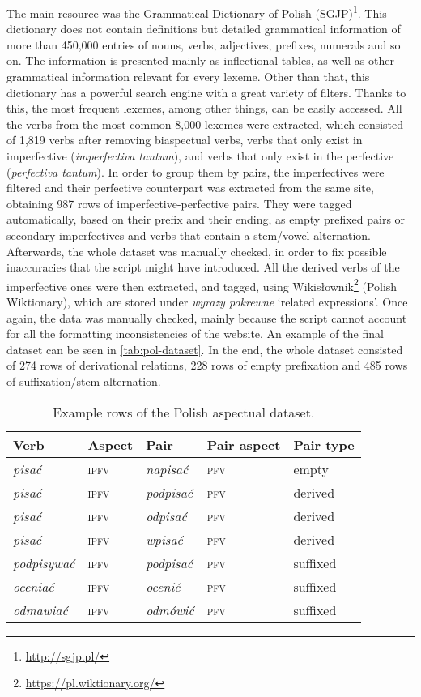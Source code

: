 \documentclass[12pt]{article}
\newcommand{\ita}[1]{\textit{#1}}
\begin{document}
The main resource was the Grammatical Dictionary of Polish (SGJP)\footnote{\url{http://sgjp.pl/}}. This dictionary does not contain definitions but detailed grammatical information of more than 450,000 entries of nouns, verbs, adjectives, prefixes, numerals and so on. The information is presented mainly as inflectional tables, as well as other grammatical information relevant for every lexeme. Other than that, this dictionary has a powerful search engine with a great variety of filters. Thanks to this, the most frequent lexemes, among other things, can be easily accessed. All the verbs from the most common 8,000 lexemes were extracted, which consisted of 1,819 verbs after removing biaspectual verbs, verbs that only exist in imperfective (\textit{imperfectiva tantum}), and verbs that only exist in the perfective (\textit{perfectiva tantum}). In order to group them by pairs, the imperfectives were filtered and their perfective counterpart was extracted from the same site, obtaining 987 rows of imperfective-perfective pairs. They were tagged automatically, based on their prefix and their ending, as empty prefixed pairs or secondary imperfectives and verbs that contain a stem/vowel alternation. Afterwards, the whole dataset was manually checked, in order to fix possible inaccuracies that the script might have introduced. All the derived verbs of the imperfective ones were then extracted, and tagged, using Wikisłownik\footnote{\url{https://pl.wiktionary.org/}} (Polish Wiktionary), which are stored under \ita{wyrazy pokrewne} `related expressions'. Once again, the data was manually checked, mainly because the script cannot account for all the formatting inconsistencies of the website. An example of the final dataset can be seen in \autoref{tab:pol-dataset}. In the end, the whole dataset consisted of 274 rows of derivational relations, 228 rows of empty prefixation and 485 rows of suffixation/stem alternation.

\begin{table}[h!]
\centering
\small
\begin{tabular}{lllll}
    \toprule
    \textbf{Verb} & \textbf{Aspect} & \textbf{Pair} & \textbf{Pair aspect} & \textbf{Pair type} \\ 
    \midrule
    \textit{pisać}  & \textsc{ipfv} &\textit{napisać} & \textsc{pfv} & empty \\
    \textit{pisać}  & \textsc{ipfv}  & \textit{podpisać} & \textsc{pfv} & derived  \\
    \ita{pisać} & \textsc{ipfv}  & \ita{odpisać} & \textsc{pfv} & derived \\
    \ita{pisać} & \textsc{ipfv}  & \ita{wpisać} & \textsc{pfv} & derived \\
    \textit{podpisywać} & \textsc{ipfv}  & \textit{podpisać} & \textsc{pfv} & suffixed  \\
    \textit{oceniać} & \textsc{ipfv} & \textit{ocenić} & \textsc{pfv} & suffixed \\
    \textit{odmawiać} &	\textsc{ipfv} & \textit{odmówić} & \textsc{pfv} &	suffixed \\    
    \bottomrule
\end{tabular}
\caption{Example rows of the Polish aspectual dataset.}
\label{tab:pol-dataset}
\end{table}
\end{document}
